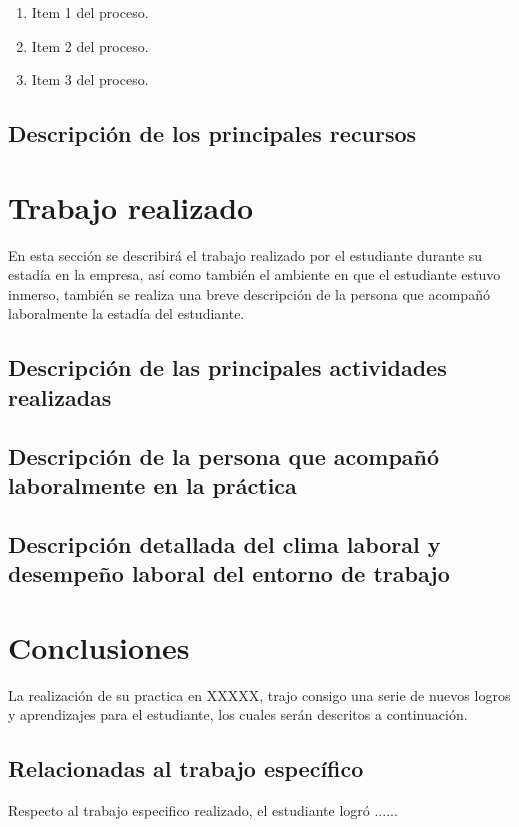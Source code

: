 \documentclass[12pt,letter,spanish]{article}
\begin{document}
\begin{enumerate}
    \item Item 1 del proceso.
    \item Item 2 del proceso.
    \item Item 3 del proceso.
\end{enumerate}



\subsection{Descripción de los principales recursos}




\newpage

\section{Trabajo realizado}%
En esta sección se describirá el trabajo realizado por el estudiante durante su estadía en la empresa, así como también el ambiente en que el estudiante estuvo inmerso, también se realiza una breve descripción de la persona que acompañó laboralmente la estadía del estudiante.
\subsection{Descripción de las principales actividades realizadas}
\subsection{Descripción de la persona que acompañó laboralmente en la práctica}
\subsection{Descripción detallada del clima laboral y desempeño laboral del entorno de trabajo}


\newpage

\section{Conclusiones}%

La realización de su practica en XXXXX, trajo consigo una serie de nuevos logros y aprendizajes para el estudiante, los cuales serán descritos a continuación.

\subsection{Relacionadas al trabajo específico}
Respecto al trabajo especifico realizado, el estudiante logró ......
\end{document}

